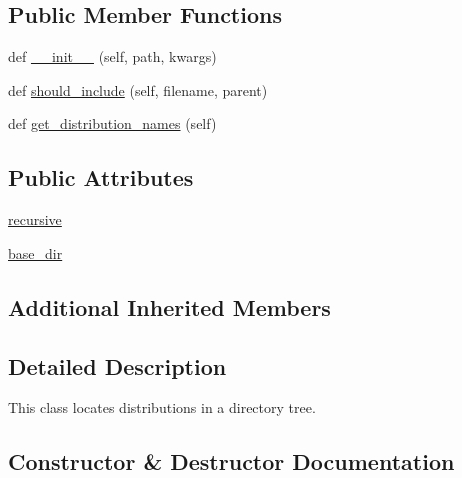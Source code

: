 \subsection*{Public Member Functions}
\begin{DoxyCompactItemize}
\item 
def \hyperlink{classpip_1_1__vendor_1_1distlib_1_1locators_1_1DirectoryLocator_a6e7dfda67f3be34d3f869b1da5254ebc}{\+\_\+\+\_\+init\+\_\+\+\_\+} (self, path, kwargs)
\item 
def \hyperlink{classpip_1_1__vendor_1_1distlib_1_1locators_1_1DirectoryLocator_a638b519b3314ed7fb3e36adcf5f37d37}{should\+\_\+include} (self, filename, parent)
\item 
def \hyperlink{classpip_1_1__vendor_1_1distlib_1_1locators_1_1DirectoryLocator_a9ec177430802b7a92b2f458cb66c4d12}{get\+\_\+distribution\+\_\+names} (self)
\end{DoxyCompactItemize}
\subsection*{Public Attributes}
\begin{DoxyCompactItemize}
\item 
\hyperlink{classpip_1_1__vendor_1_1distlib_1_1locators_1_1DirectoryLocator_a25c9cd43dfbe637734612d1adf822926}{recursive}
\item 
\hyperlink{classpip_1_1__vendor_1_1distlib_1_1locators_1_1DirectoryLocator_a3c8ba409680d20b5157fe1e4aa9e3ad3}{base\+\_\+dir}
\end{DoxyCompactItemize}
\subsection*{Additional Inherited Members}


\subsection{Detailed Description}
\begin{DoxyVerb}This class locates distributions in a directory tree.
\end{DoxyVerb}
 

\subsection{Constructor \& Destructor Documentation}
\mbox{\label{classpip_1_1__vendor_1_1distlib_1_1locators_1_1DirectoryLocator_a6e7dfda67f3be34d3f869b1da5254ebc}} 
